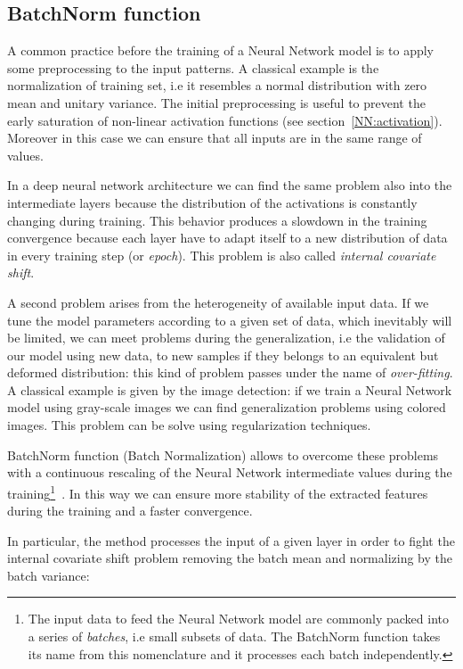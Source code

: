 \documentclass{standalone}
\begin{document}
\subsection[BatchNorm function]{BatchNorm function}\label{NN:batchnorm}

A common practice before the training of a Neural Network model is to apply some preprocessing to the input patterns.
A classical example is the normalization of training set, i.e it resembles a normal distribution with zero mean and unitary variance.
The initial preprocessing is useful to prevent the early saturation of non-linear activation functions (see section~\ref{NN:activation}).
Moreover in this case we can ensure that all inputs are in the same range of values.

In a deep neural network architecture we can find the same problem also into the intermediate layers because the distribution of the activations is constantly changing during training.
This behavior produces a slowdown in the training convergence because each layer have to adapt itself to a new distribution of data in every training step (or \emph{epoch}).
This problem is also called \emph{internal covariate shift}.

A second problem arises from the heterogeneity of available input data.
If we tune the model parameters according to a given set of data, which inevitably will be limited, we can meet problems during the generalization, i.e the validation of our model using new data, to new samples if they belongs to an equivalent but deformed distribution: this kind of problem passes under the name of \emph{over-fitting}.
A classical example is given by the image detection: if we train a Neural Network model using gray-scale images we can find generalization problems using colored images.
This problem can be solve using regularization techniques.

BatchNorm function (Batch Normalization) allows to overcome these problems with a continuous rescaling of the Neural Network intermediate values during the training\footnote{
  The input data to feed the Neural Network model are commonly packed into a series of \emph{batches}, i.e small subsets of data.
  The BatchNorm function takes its name from this nomenclature and it processes each batch independently.
}~\cite{Sergey2015BatchNorm}.
In this way we can ensure more stability of the extracted features~\cite{Lecun2000EffBackProp} during the training and a faster convergence.

In particular, the method processes the input of a given layer in order to fight the internal covariate shift problem removing the batch mean and normalizing by the batch variance:
\end{document}
